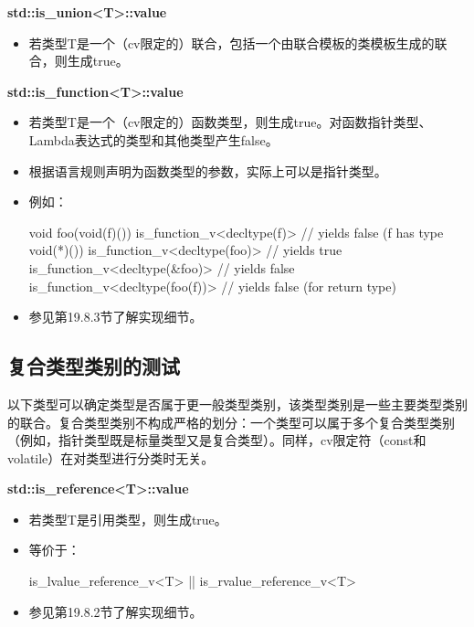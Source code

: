 \textbf{std::is\_union<T>::value}

\begin{itemize}
\item 
若类型T是一个（cv限定的）联合，包括一个由联合模板的类模板生成的联合，则生成true。
\end{itemize}

\textbf{std::is\_function<T>::value}

\begin{itemize}
\item 
若类型T是一个（cv限定的）函数类型，则生成true。对函数指针类型、Lambda表达式的类型和其他类型产生false。

\item 
根据语言规则声明为函数类型的参数，实际上可以是指针类型。

\item 
例如：
\begin{cpp}
void foo(void(f)())
{
	is_function_v<decltype(f)> // yields false (f has type void(*)())
	is_function_v<decltype(foo)> // yields true
	is_function_v<decltype(&foo)> // yields false
	is_function_v<decltype(foo(f))> // yields false (for return type)
}
\end{cpp}

\item 
参见第19.8.3节了解实现细节。
\end{itemize}

\subsection{复合类型类别的测试}

以下类型可以确定类型是否属于更一般类型类别，该类型类别是一些主要类型类别的联合。复合类型类别不构成严格的划分：一个类型可以属于多个复合类型类别（例如，指针类型既是标量类型又是复合类型）。同样，cv限定符（const和volatile）在对类型进行分类时无关。

\textbf{std::is\_reference<T>::value}

\begin{itemize}
\item 
若类型T是引用类型，则生成true。

\item 
等价于： 
\begin{cpp}
is_lvalue_reference_v<T> || is_rvalue_reference_v<T>
\end{cpp}

\item 
参见第19.8.2节了解实现细节。
\end{itemize}


